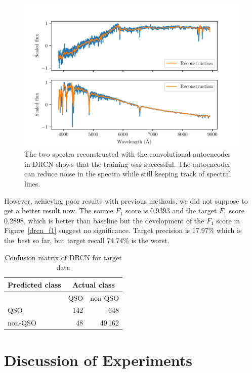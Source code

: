 \begin{figure}
\includegraphics[width=\textwidth]{img/reconstructed_spectra.pdf}
\caption[Spectra reconstructed with convolutional autoencoder]{
	The two spectra reconstructed with the convolutional autoencoder in DRCN shows that the training was successful.
	The autoencoder can reduce noise in the spectra
	while still keeping track of spectral lines.
}
\label{reconstruction}
\end{figure}

However, achieving poor results with previous methods,
we did not suppose to get a better result now.
The source \(F_1\) score is 0.9393 and the target \(F_1\) score 0.2898,
which is better than baseline
but the development of the \(F_1\) score in Figure~\ref{drcn_f1} suggest no significance.
Target precision is 17.97\% which is the~best so far,
but target recall 74.74\% is the worst.

\begin{table}
\begin{center}
\begin{tabular}{|l|r|r|}
	\hline
	Predicted class & \multicolumn{2}{c|}{Actual class} \\
	\hline \hline
	& QSO & non-QSO \\ \hline
	QSO & 142 & 648 \\ \hline
	non-QSO & 48 & 49\,162 \\ \hline
\end{tabular}
\end{center}
\caption{Confusion matrix of DRCN for target data}
\end{table}

\section{Discussion of Experiments}

